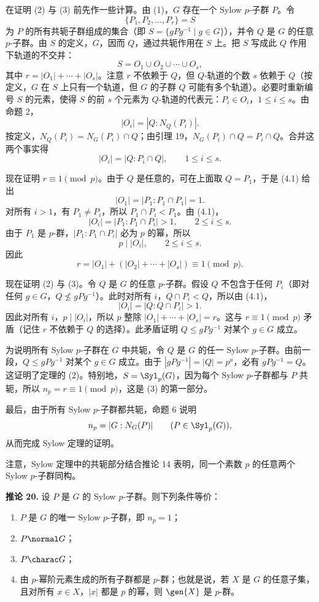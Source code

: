 在证明 (2) 与 (3) 前先作一些计算。由 (1)，$G$ 存在一个 Sylow $p$-子群 $P$。令
\[
  \{P_1,P_2,\ldots,P_r\}=S
\]
为 $P$ 的所有共轭子群组成的集合（即 $S=\{gPg^{-1}\mid g\in G\}$），并令 $Q$ 是 $G$ 的任意 $p$-子群。由 $S$ 的定义，$G$，因而 $Q$，通过共轭作用在 $S$ 上。把 $S$ 写成此 $Q$ 作用下轨道的不交并：
\[
  S=O_1\cup O_2\cup\cdots\cup O_s,
\]
其中 $r=|O_1|+\cdots+|O_s|$。注意 $r$ 不依赖于 $Q$，但 $Q$-轨道的个数 $s$ 依赖于 $Q$（按定义，$G$ 在 $S$ 上只有一个轨道，但 $G$ 的子群 $Q$ 可能有多个轨道）。必要时重新编号 $S$ 的元素，使得 $S$ 的前 $s$ 个元素为 $Q$-轨道的代表元：$P_i\in O_i$，$1\leq i\leq s$。由命题 2，
\[
  |O_i|=|Q:N_Q(P_i)|.
\]
按定义，$N_Q(P_i)=N_G(P_i)\cap Q$；由引理 19，$N_G(P_i)\cap Q=P_i\cap Q$。合并这两个事实得
\[
  |O_i|=|Q:P_i\cap Q|,
  \qquad 1\leq i\leq s. \tag{4.1}
\]

现在证明 $r\equiv1\pmod p$。由于 $Q$ 是任意的，可在上面取 $Q=P_1$，于是 (4.1) 给出
\[
  |O_1|=|P_1:P_1\cap P_1|=1.
\]
对所有 $i>1$，有 $P_1\neq P_i$，所以 $P_1\cap P_i<P_1$。由 (4.1)，
\[
  |O_i|=|P_1:P_1\cap P_i|>1,
  \qquad 2\leq i\leq s.
\]
由于 $P_1$ 是 $p$-群，$|P_1:P_1\cap P_i|$ 必为 $p$ 的幂，所以
\[
  p\mid |O_i|,
  \qquad 2\leq i\leq s.
\]
因此
\[
  r=|O_1|+(|O_2|+\cdots+|O_s|)\equiv1\pmod p.
\]

现在证明 (2) 与 (3)。令 $Q$ 是 $G$ 的任意 $p$-子群。假设 $Q$ 不包含于任何 $P_i$（即对任何 $g\in G$，$Q\nleq gPg^{-1}$）。此时对所有 $i$，$Q\cap P_i<Q$，所以由 (4.1)，
\[
  |O_i|=|Q:Q\cap P_i|>1.
\]
因此对所有 $i$，$p\mid |O_i|$，所以 $p$ 整除 $|O_1|+\cdots+|O_s|=r$。这与 $r\equiv1\pmod p$ 矛盾（记住 $r$ 不依赖于 $Q$ 的选择）。此矛盾证明 $Q\leq gPg^{-1}$ 对某个 $g\in G$ 成立。

为说明所有 Sylow $p$-子群在 $G$ 中共轭，令 $Q$ 是 $G$ 的任一 Sylow $p$-子群。由前一段，$Q\leq gPg^{-1}$ 对某个 $g\in G$ 成立。由于 $|gPg^{-1}|=|Q|=p^a$，必有 $gPg^{-1}=Q$。这证明了定理的 (2)。特别地，$S=\Syl_p(G)$，因为每个 Sylow $p$-子群都与 $P$ 共轭，所以 $n_p=r\equiv1\pmod p$，这是 (3) 的第一部分。

最后，由于所有 Sylow $p$-子群都共轭，命题 6 说明
\[
  n_p=|G:N_G(P)|\qquad(P\in\Syl_p(G)),
\]
从而完成 Sylow 定理的证明。

注意，Sylow 定理中的共轭部分结合推论 14 表明，同一个素数 $p$ 的任意两个 Sylow $p$-子群同构。

\medskip
\noindent\textbf{推论 20.} 设 $P$ 是 $G$ 的 Sylow $p$-子群。则下列条件等价：
\begin{enumerate}[label=(\arabic*)]
  \item $P$ 是 $G$ 的唯一 Sylow $p$-子群，即 $n_p=1$；
  \item $P\normal G$；
  \item $P\charac G$；
  \item 由 $p$-幂阶元素生成的所有子群都是 $p$-群；也就是说，若 $X$ 是 $G$ 的任意子集，且对所有 $x\in X$，$|x|$ 都是 $p$ 的幂，则 $\gen{X}$ 是 $p$-群。
\end{enumerate}

